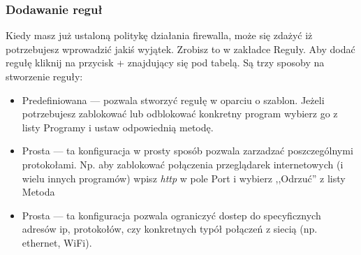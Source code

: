 \subsubsection{Dodawanie reguł}
Kiedy masz już ustaloną politykę działania firewalla, może się zdażyć iż potrzebujesz wprowadzić jakiś wyjątek. Zrobisz to w zakładce \textcolor{ubuntu_orange}{Reguły}. Aby dodać regułę kliknij na przycisk + znajdujący się pod tabelą. Są trzy sposoby na stworzenie reguły:
\begin{itemize}
\item \textcolor{ubuntu_orange}{Predefiniowana} --- pozwala stworzyć regułę w oparciu o szablon. Jeżeli potrzebujesz zablokować lub odblokować konkretny program wybierz go z listy \textcolor{ubuntu_orange}{Programy} i ustaw odpowiednią metodę.
\item \textcolor{ubuntu_orange}{Prosta} --- ta konfiguracja w prosty sposób pozwala zarzadzać poszczególnymi protokołami. Np. aby zablokować połączenia przeglądarek internetowych (i wielu innych programów) wpisz \textit{http} w pole \textcolor{ubuntu_orange}{Port} i wybierz ,,Odrzuć'' z listy \textcolor{ubuntu_orange}{Metoda}
\item \textcolor{ubuntu_orange}{Prosta} --- ta konfiguracja pozwala ograniczyć dostep do specyficznych adresów ip, protokołów, czy konkretnych typół połączeń z siecią (np. ethernet, WiFi).
\end{itemize}
